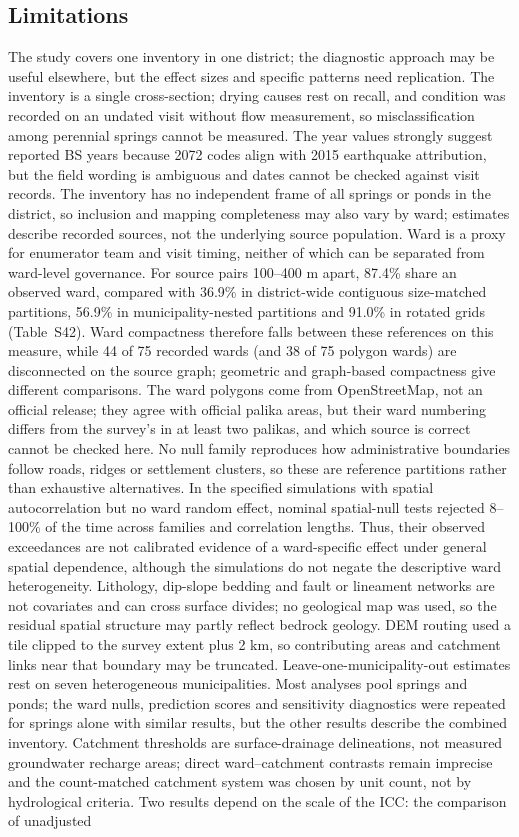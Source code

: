 \documentclass[preprint,12pt,authoryear]{elsarticle}
\begin{document}
\subsection{Limitations}
The study covers one inventory in one district; the diagnostic approach may be useful elsewhere, but the effect sizes and specific patterns need replication. The inventory is a single cross-section; drying causes rest on recall, and condition was recorded on an undated visit without flow measurement, so misclassification among perennial springs cannot be measured. The year values strongly suggest reported BS years because 2072 codes align with 2015 earthquake attribution, but the field wording is ambiguous and dates cannot be checked against visit records. The inventory has no independent frame of all springs or ponds in the district, so inclusion and mapping completeness may also vary by ward; estimates describe recorded sources, not the underlying source population. Ward is a proxy for enumerator team and visit timing, neither of which can be separated from ward-level governance. For source pairs 100--400 m apart, 87.4\% share an observed ward, compared with 36.9\% in district-wide contiguous size-matched partitions, 56.9\% in municipality-nested partitions and 91.0\% in rotated grids (Table~S42). Ward compactness therefore falls between these references on this measure, while 44 of 75 recorded wards (and 38 of 75 polygon wards) are disconnected on the source graph; geometric and graph-based compactness give different comparisons. The ward polygons come from OpenStreetMap, not an official release; they agree with official palika areas, but their ward numbering differs from the survey's in at least two palikas, and which source is correct cannot be checked here. No null family reproduces how administrative boundaries follow roads, ridges or settlement clusters, so these are reference partitions rather than exhaustive alternatives. In the specified simulations with spatial autocorrelation but no ward random effect, nominal spatial-null tests rejected 8--100\% of the time across families and correlation lengths. Thus, their observed exceedances are not calibrated evidence of a ward-specific effect under general spatial dependence, although the simulations do not negate the descriptive ward heterogeneity. Lithology, dip-slope bedding and fault or lineament networks are not covariates and can cross surface divides; no geological map was used, so the residual spatial structure may partly reflect bedrock geology. DEM routing used a tile clipped to the survey extent plus 2 km, so contributing areas and catchment links near that boundary may be truncated. Leave-one-municipality-out estimates rest on seven heterogeneous municipalities. Most analyses pool springs and ponds; the ward nulls, prediction scores and sensitivity diagnostics were repeated for springs alone with similar results, but the other results describe the combined inventory. Catchment thresholds are surface-drainage delineations, not measured groundwater recharge areas; direct ward--catchment contrasts remain imprecise and the count-matched catchment system was chosen by unit count, not by hydrological criteria. Two results depend on the scale of the ICC: the comparison of unadjusted 
\end{document}
